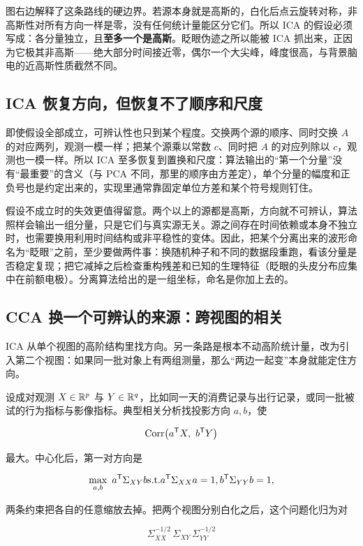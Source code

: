 图右边解释了这条路线的硬边界。若源本身就是高斯的，白化后点云旋转对称，非高斯性对所有方向一样是零，没有任何统计量能区分它们。所以 ICA 的假设必须写成：各分量独立，且\textbf{至多一个是高斯}。眨眼伪迹之所以能被 ICA 抓出来，正因为它极其非高斯——绝大部分时间接近零，偶尔一个大尖峰，峰度很高，与背景脑电的近高斯性质截然不同。

\subsection{ICA 恢复方向，但恢复不了顺序和尺度}

即使假设全部成立，可辨认性也只到某个程度。交换两个源的顺序、同时交换 \(A\) 的对应两列，观测一模一样；把某个源乘以常数 \(c\)、同时把 \(A\) 的对应列除以 \(c\)，观测也一模一样。所以 ICA 至多恢复到置换和尺度：算法输出的``第一个分量''没有``最重要''的含义（与 PCA 不同，那里的顺序由方差定），单个分量的幅度和正负号也是约定出来的，实现里通常靠固定单位方差和某个符号规则钉住。

假设不成立时的失效更值得留意。两个以上的源都是高斯，方向就不可辨认，算法照样会输出一组分量，只是它们与真实源无关。源之间存在时间依赖或本身不独立时，也需要换用利用时间结构或非平稳性的变体。因此，把某个分离出来的波形命名为``眨眼''之前，至少要做两件事：换随机种子和不同的数据段重跑，看该分量是否稳定复现；把它减掉之后检查重构残差和已知的生理特征（眨眼的头皮分布应集中在前额电极）。分离算法给出的是一组坐标，命名是你加上去的。

\subsection{CCA 换一个可辨认的来源：跨视图的相关}

ICA 从单个视图的高阶结构里找方向。另一条路是根本不动高阶统计量，改为引入第二个视图：如果同一批对象上有两组测量，那么``两边一起变''本身就能定住方向。

设成对观测 \(X\in\mathbb{R}^p\) 与 \(Y\in\mathbb{R}^q\)，比如同一天的消费记录与出行记录，或同一批被试的行为指标与影像指标。典型相关分析找投影方向 \(a,b\)，使

\[
\Corr\bigl(a^{\trans}X,\ b^{\trans}Y\bigr)
\]

最大。中心化后，第一对方向是

\[
\max_{a,b}\ a^{\mathsf{T}}\Sigma_{XY}b
\space\text{s.t.}\space
a^{\mathsf{T}}\Sigma_{XX}a=1,\space b^{\mathsf{T}}\Sigma_{YY}b=1 ,
\]

两条约束把各自的任意缩放去掉。把两个视图分别白化之后，这个问题化归为对

\[
\Sigma_{XX}^{-1/2}\,\Sigma_{XY}\,\Sigma_{YY}^{-1/2}
\]

